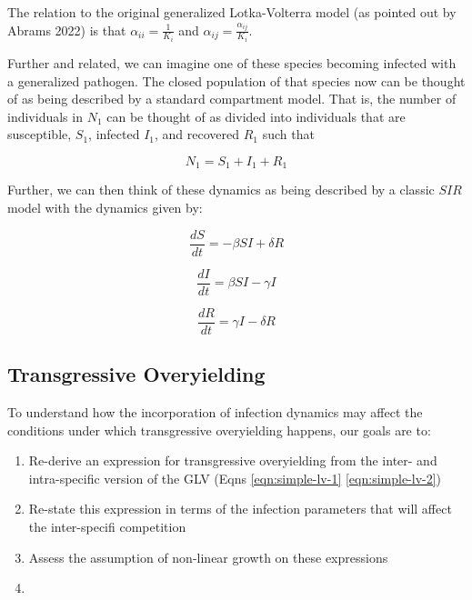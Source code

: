 \documentclass[
  letterpaper,
  DIV=11,
  numbers=noendperiod]{scrartcl}
\providecommand{\tightlist}{%
  \setlength{\itemsep}{0pt}\setlength{\parskip}{0pt}}\usepackage{longtable,booktabs,array}
\begin{document}
The relation to the original generalized Lotka-Volterra model (as
pointed out by Abrams 2022) is that \(\alpha_{ii} = \frac{1}{K_i}\) and
\(\alpha_{ij} = \frac{\alpha_{ij}}{K_i}\).

Further and related, we can imagine one of these species becoming
infected with a generalized pathogen. The closed population of that
species now can be thought of as being described by a standard
compartment model. That is, the number of individuals in \(N_1\) can be
thought of as divided into individuals that are susceptible, \(S_1\),
infected \(I_1\), and recovered \(R_1\) such that

\begin{equation} 
\label{eqn:sum-sir}
  N_1 = S_1 + I_1 + R_1
\end{equation}

Further, we can then think of these dynamics as being described by a
classic \(SIR\) model with the dynamics given by:

\begin{equation}
\label{eqn:basic-sir-s}
  \frac{dS}{dt} = - \beta S I + \delta R 
\end{equation}

\begin{equation}
\label{eqn:basic-sir-i}
  \frac{dI}{dt} = \beta S I - \gamma I 
\end{equation}

\begin{equation}
\label{eqn:basic-sir-r}
  \frac{dR}{dt} = \gamma I - \delta R
\end{equation}

\subsection{Transgressive Overyielding}

To understand how the incorporation of infection dynamics may affect the
conditions under which transgressive overyielding happens, our goals are
to:

\begin{enumerate}
\def\labelenumi{\arabic{enumi})}
\tightlist
\item
  Re-derive an expression for transgressive overyielding from the inter-
  and intra-specific version of the GLV (Eqns \ref{eqn:simple-lv-1}
  \ref{eqn:simple-lv-2})
\item
  Re-state this expression in terms of the infection parameters that
  will affect the inter-specifi competition
\item
  Assess the assumption of non-linear growth on these expressions
\item
\end{enumerate}
\end{document}
